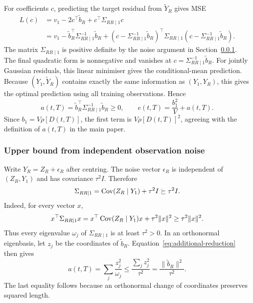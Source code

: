 For coefficients $c$, predicting the target residual from $\widetilde Y_R$ gives MSE
\begin{align*}
 L(c)&=v_1-2c^\top\widetilde b_R+c^\top\Sigma_{RR\mid1}c\\
 &=v_1-\widetilde b_R^{\top}\Sigma_{RR\mid1}^{-1}\widetilde b_R
 +(c-\Sigma_{RR\mid1}^{-1}\widetilde b_R)^\top
   \Sigma_{RR\mid1}(c-\Sigma_{RR\mid1}^{-1}\widetilde b_R).
\end{align*}
The matrix $\Sigma_{RR\mid1}$ is positive definite by the noise argument in Section~\ref{sec:bound-noise}. The final quadratic form is nonnegative and vanishes at $c=\Sigma_{RR\mid1}^{-1}\widetilde b_R$. For jointly Gaussian residuals, this linear minimiser gives the conditional-mean prediction. Because $(Y_1,\widetilde Y_R)$ contains exactly the same information as $(Y_1,Y_R)$, this gives the optimal prediction using all training observations. Hence
\begin{equation}
 a(t,T)=\widetilde b_R^{\top}\Sigma_{RR\mid1}^{-1}\widetilde b_R\geq0,
 \qquad e(t,T)=\frac{b_1^2}{V}+a(t,T).
 \label{eq:additional-reduction}
\end{equation}
Since $b_1=V\rho[D(t,T)]$, the first term is $V\rho[D(t,T)]^2$, agreeing with the definition of $a(t,T)$ in the main paper.

\subsubsection{Upper bound from independent observation noise}
\label{sec:bound-noise}
Write $Y_R=Z_R+\epsilon_R$ after centring. The noise vector $\epsilon_R$ is independent of $(Z_R,Y_1)$ and has covariance $\tau^2I$. Therefore
\[
 \Sigma_{RR\mid1}=\operatorname{Cov}(Z_R\mid Y_1)+\tau^2I\succeq\tau^2I.
\]
Indeed, for every vector $x$,
\[
 x^\top\Sigma_{RR\mid1}x
 =x^\top\operatorname{Cov}(Z_R\mid Y_1)x+\tau^2\|x\|^2
 \geq\tau^2\|x\|^2.
\]
Thus every eigenvalue $\omega_j$ of $\Sigma_{RR\mid1}$ is at least $\tau^2>0$. In an orthonormal eigenbasis, let $z_j$ be the coordinates of $\widetilde b_R$. Equation~\eqref{eq:additional-reduction} then gives
\begin{equation}
 a(t,T)=\sum_j\frac{z_j^2}{\omega_j}
 \leq\frac{\sum_jz_j^2}{\tau^2}
 =\frac{\|\widetilde b_R\|^2}{\tau^2}.
 \label{eq:noise-bound}
\end{equation}
The last equality follows because an orthonormal change of coordinates preserves squared length.


